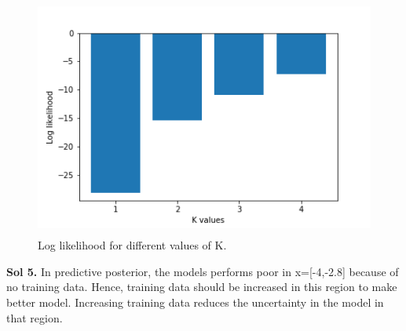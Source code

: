 \documentclass[a4paper,11pt]{article}
\begin{document}
\begin{pmisolution}
\begin{figure}[h]
\centering
\includegraphics[height=3.1in]{question_6d.png}
\caption{ Log likelihood for different values of K.}
\end{figure}
\break
\textbf{Sol 5.} In predictive posterior, the models performs poor in x=[-4,-2.8] because of no training data. Hence, training data should be increased in this region to make better model. Increasing training data reduces the uncertainty in the model in that region.
\end{pmisolution}
\end{document}
